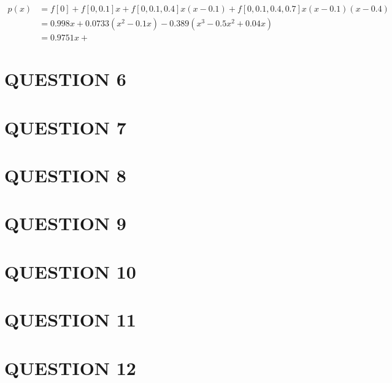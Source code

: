 \documentclass[a4paper]{article}
\begin{document}
\begin{align*}
p(x) & = f[0] + f[0,0.1]x + f[0,0.1,0.4]x(x-0.1) + f[0,0.1,0.4,0.7]x(x-0.1)(x-0.4)  \\
& = 0.998 x + 0.0733(x^2 -0.1x) - 0.389(x^{3} -0.5x^{2}  + 0.04x)\\
& = 0.9751 x + 
\end{align*}



\section{QUESTION 6}




\section{QUESTION 7}
\section{QUESTION 8}
\section{QUESTION 9}
\section{QUESTION 10}
\section{QUESTION 11}
\section{QUESTION 12}
\end{document}
